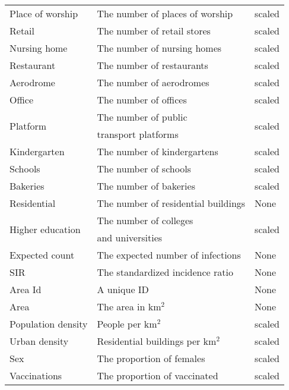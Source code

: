 \begin{table}[H]
\begin{tabular}{l l l}
Place of worship & The number of places of worship & scaled \\
Retail & The number of retail stores & scaled \\
Nursing home & The number of nursing homes & scaled \\
Restaurant & The number of restaurants & scaled \\
Aerodrome & The number of aerodromes & scaled \\
Office & The number of offices & scaled \\
\multirow{2}{*}{Platform} & The number of public & \multirow{2}{*}{scaled} \\
& transport platforms \\
Kindergarten & The number of kindergartens & scaled \\
Schools & The number of schools & scaled \\
Bakeries & The number of bakeries & scaled \\
Residential & The number of residential buildings & None \\
\multirow{2}{*}{Higher education} & The number of colleges & \multirow{2}{*}{scaled} \\
& and universities \\
Expected count & The expected number of infections & None \\
SIR & The standardized incidence ratio & None \\
Area Id & A unique ID & None \\
Area & The area in km$^2$ & None \\
Population density & People per km$^2$ & scaled\\
\multirow{1}{*}{Urban density} &  Residential buildings per km$^2$ & scaled \\
Sex & The proportion of females & scaled \\
Vaccinations & The proportion of vaccinated & scaled \\
\bottomrule
\end{tabular}
\end{table}
